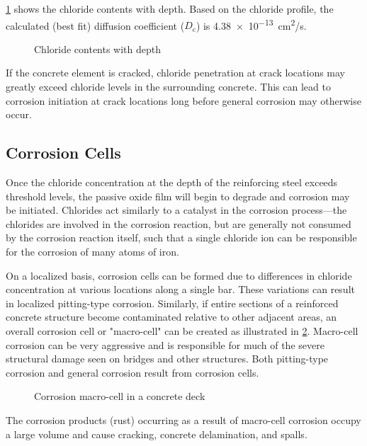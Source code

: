\ref{fig:chloride-contents-with-depth} shows the chloride contents with depth. Based on the chloride profile, the calculated (best fit) diffusion coefficient ($D_\text{c}$) is \qty{4.38e-13}{cm^2/s}.

\begin{figure}
  \caption{Chloride contents with depth}
  \label{fig:chloride-contents-with-depth}
\end{figure}

If the concrete element is cracked, chloride penetration at crack locations may greatly exceed chloride levels in the surrounding concrete. This can lead to corrosion initiation at crack locations long before general corrosion may otherwise occur.

\subsection{Corrosion Cells}
Once the chloride concentration at the depth of the reinforcing steel exceeds threshold levels, the passive oxide film will begin to degrade and corrosion may be initiated. Chlorides act similarly to a catalyst in the corrosion process—the chlorides are involved in the corrosion reaction, but are generally not consumed by the corrosion reaction itself, such that a single chloride ion can be responsible for the corrosion of many atoms of iron.

On a localized basis, corrosion cells can be formed due to differences in chloride concentration at various locations along a single bar. These variations can result in localized pitting-type corrosion. Similarly, if entire sections of a reinforced concrete structure become contaminated relative to other adjacent areas, an overall corrosion cell or "macro-cell" can be created as illustrated in \cref{fig:corrosion-macro-cell}. Macro-cell corrosion can be very aggressive and is responsible for much of the severe structural damage seen on bridges and other structures. Both pitting-type corrosion and general corrosion result from corrosion cells.

\begin{figure}
  \caption{Corrosion macro-cell in a concrete deck}
  \label{fig:corrosion-macro-cell}
\end{figure}

The corrosion products (rust) occurring as a result of macro-cell corrosion occupy a large volume and cause cracking, concrete delamination, and spalls.


